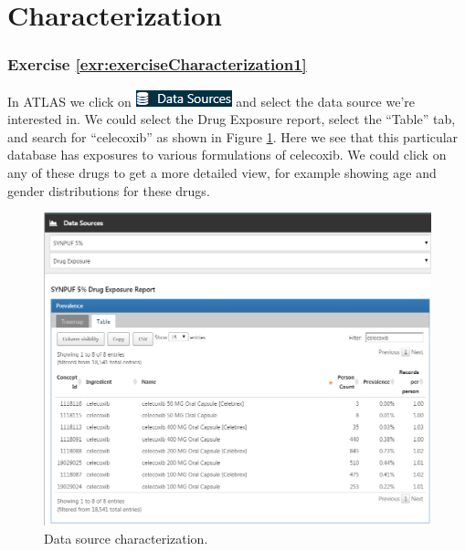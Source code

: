 \documentclass[11pt]{book}
\theoremstyle{definition}
\theoremstyle{definition}
\theoremstyle{definition}
\theoremstyle{remark}
\begin{document}
\section{Characterization}\label{Characterizationanswers}

\subsubsection*{Exercise
\ref{exr:exerciseCharacterization1}}\label{exercise-refexrexercisecharacterization1}

In ATLAS we click on
\includegraphics{images/Characterization/atlasDataSourcesMenuItem.png}
and select the data source we're interested in. We could select the Drug
Exposure report, select the ``Table'' tab, and search for ``celecoxib''
as shown in Figure \ref{fig:dataSourcesAtlas}. Here we see that this
particular database has exposures to various formulations of celecoxib.
We could click on any of these drugs to get a more detailed view, for
example showing age and gender distributions for these drugs.

\begin{figure}

{\centering \includegraphics[width=1\linewidth]{images/SuggestedAnswers/dataSourcesAtlas} 

}

\caption{Data source characterization.}\label{fig:dataSourcesAtlas}
\end{figure}
\end{document}
